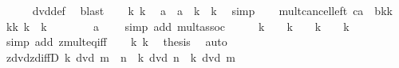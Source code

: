 \begin{isabellebody}
\ \ \ \ \isamarkupfalse%
\ dvd{\isacharunderscore}{\kern0pt}def\ \isamarkupfalse%
\ blast\isanewline
\ \ \isamarkupfalse%
\ k\ k{\isacharprime}{\kern0pt}\ \isamarkupfalse%
\ {\isachardoublequoteopen}a\ {\isacharequal}{\kern0pt}\ a\ {\isacharasterisk}{\kern0pt}\ k\ {\isacharasterisk}{\kern0pt}\ k{\isacharprime}{\kern0pt}{\isachardoublequoteclose}\ \isamarkupfalse%
\ simp\isanewline
\ \ \isamarkupfalse%
\ mult{\isacharunderscore}{\kern0pt}cancel{\isacharunderscore}{\kern0pt}left{}{\isacharbrackleft}{\kern0pt}\ c{\isacharequal}{\kern0pt}{\isachardoublequoteopen}a{\isachardoublequoteclose}\ \ b{\isacharequal}{\kern0pt}{\isachardoublequoteopen}k{\isacharasterisk}{\kern0pt}k{\isacharprime}{\kern0pt}{\isachardoublequoteclose}{\isacharbrackright}{\kern0pt}\ \isamarkupfalse%
\ kk{\isacharprime}{\kern0pt}{\isacharcolon}{\kern0pt}\ {\isachardoublequoteopen}k\ {\isacharasterisk}{\kern0pt}\ k{\isacharprime}{\kern0pt}\ {\isacharequal}{\kern0pt}\ {}{\isachardoublequoteclose}\isanewline
\ \ \ \ \isamarkupfalse%
\ {\isacartoucheopen}a\ {\isasymnoteq}\ {}{\isacartoucheclose}\ \isamarkupfalse%
\ {\isacharparenleft}{\kern0pt}simp\ add{\isacharcolon}{\kern0pt}\ mult{\isachardot}{\kern0pt}assoc{\isacharparenright}{\kern0pt}\isanewline
\ \ \isamarkupfalse%
\ \isamarkupfalse%
\ {\isachardoublequoteopen}k\ {\isacharequal}{\kern0pt}\ {}\ {\isasymand}\ k{\isacharprime}{\kern0pt}\ {\isacharequal}{\kern0pt}\ {}\ {\isasymor}\ k\ {\isacharequal}{\kern0pt}\ {\isacharminus}{\kern0pt}{}\ {\isasymand}\ k{\isacharprime}{\kern0pt}\ {\isacharequal}{\kern0pt}\ {\isacharminus}{\kern0pt}{}{\isachardoublequoteclose}\isanewline
\ \ \ \ \isamarkupfalse%
\ {\isacharparenleft}{\kern0pt}simp\ add{\isacharcolon}{\kern0pt}\ zmult{\isacharunderscore}{\kern0pt}eq{\isacharunderscore}{\kern0pt}{}{\isacharunderscore}{\kern0pt}iff{\isacharparenright}{\kern0pt}\isanewline
\ \ \isamarkupfalse%
\ k\ k{\isacharprime}{\kern0pt}\ \isamarkupfalse%
\ {\isacharquery}{\kern0pt}thesis\ \isamarkupfalse%
\ auto\isanewline
{}\isamarkupfalse%
%
\endisatagproof
{\isafoldproof}%
%
\isadelimproof
\isanewline
%
\endisadelimproof
\isanewline
{}\isamarkupfalse%
\ zdvd{\isacharunderscore}{\kern0pt}zdiffD{\isacharcolon}{\kern0pt}\ {\isachardoublequoteopen}k\ dvd\ m\ {\isacharminus}{\kern0pt}\ n\ {\isasymLongrightarrow}\ k\ dvd\ n\ {\isasymLongrightarrow}\ k\ dvd\ m{\isachardoublequoteclose}\isanewline

\end{isabellebody}
